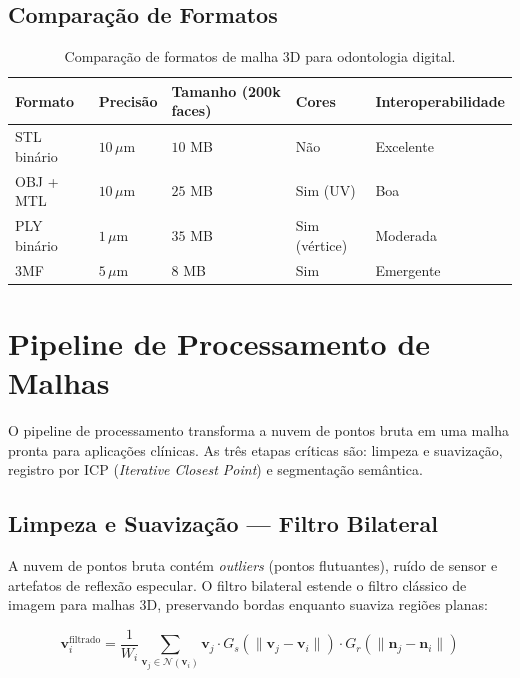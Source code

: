 \subsection{Comparação de Formatos}
\label{subsec:comparacao-formatos}

\begin{longtable}{p{2.5cm}p{2cm}p{2cm}p{2cm}p{2.5cm}}
\caption{Comparação de formatos de malha 3D para odontologia digital.}
\label{tab:comparacao-formatos}\\
\toprule
\textbf{Formato} & \textbf{Precisão} & \textbf{Tamanho (200k faces)} & \textbf{Cores} & \textbf{Interoperabilidade} \\
\midrule
STL binário & $10\,\mu\text{m}$ & $10$ MB & Não & Excelente \\
OBJ + MTL & $10\,\mu\text{m}$ & $25$ MB & Sim (UV) & Boa \\
PLY binário & $1\,\mu\text{m}$ & $35$ MB & Sim (vértice) & Moderada \\
3MF & $5\,\mu\text{m}$ & $8$ MB & Sim & Emergente \\
\bottomrule
\end{longtable}

\section{Pipeline de Processamento de Malhas}
\label{sec:pipeline-malhas}

O pipeline de processamento transforma a nuvem de pontos bruta em uma malha pronta para aplicações clínicas. As três etapas críticas são: limpeza e suavização, registro por ICP (\textit{Iterative Closest Point}) e segmentação semântica.

\subsection{Limpeza e Suavização — Filtro Bilateral}
\label{subsec:limpeza-malha}

A nuvem de pontos bruta contém \textit{outliers} (pontos flutuantes), ruído de sensor e artefatos de reflexão especular. O filtro bilateral estende o filtro clássico de imagem para malhas 3D, preservando bordas enquanto suaviza regiões planas:

\begin{equation}
\label{eq:filtro-bilateral}
\mathbf{v}_i^{\text{filtrado}} = \frac{1}{W_i} \sum_{\mathbf{v}_j \in \mathcal{N}(\mathbf{v}_i)} \mathbf{v}_j \cdot G_s(\|\mathbf{v}_j - \mathbf{v}_i\|) \cdot G_r(\|\mathbf{n}_j - \mathbf{n}_i\|)
\end{equation}

